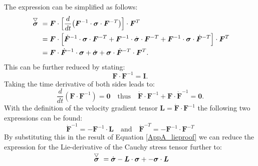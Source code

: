 The expression can be simplified as follows:
\begin{equation}\label{AppA_lieproof}
\begin{split}
\acctriang{\boldsymbol{\sigma}} &= \boldsymbol{F}\cdot\Big[\frac{d}{dt}\big(\boldsymbol{F}^{-1}\cdot\boldsymbol{\sigma}\cdot\boldsymbol{F}^{-T}\big)\Big]\cdot\boldsymbol{F}^T\\
&= \boldsymbol{F}\cdot\Big[\dot{\boldsymbol{F}}^{-1}\cdot\boldsymbol{\sigma}\cdot\boldsymbol{F}^{-T}+\boldsymbol{F}^{-1}\cdot\dot{\boldsymbol{\sigma}}\cdot\boldsymbol{F}^{-T}+\boldsymbol{F}^{-1}\cdot\boldsymbol{\sigma}\cdot\dot{\boldsymbol{F}}^{-T}\Big]\cdot\boldsymbol{F}^T\\
&= \boldsymbol{F}\cdot\dot{\boldsymbol{F}}^{-1}\cdot\boldsymbol{\sigma}+\dot{\boldsymbol{\sigma}}+\boldsymbol{\sigma}\cdot\dot{\boldsymbol{F}}^{-T}\cdot\boldsymbol{F}^T.
\end{split}
\end{equation}
This can be further reduced by stating:
\begin{equation}
\boldsymbol{F}\cdot\boldsymbol{F}^{-1}=\boldsymbol{I}.
\end{equation}
Taking the time derivative of both sides leads to:
\begin{equation}
\frac{d}{dt}(\boldsymbol{F}\cdot\boldsymbol{F}^{-1})=\boldsymbol{0} \quad\text{thus}\quad \dot{\boldsymbol{F}}\cdot\boldsymbol{F}^{-1} + \boldsymbol{F}\cdot\dot{\boldsymbol{F}}^{-1} = \boldsymbol{0}.
\end{equation}
With the definition of the velocity gradient tensor $\boldsymbol{L}=\dot{\boldsymbol{F}}\cdot\boldsymbol{F}^{-1}$ the following two expressions can be found:
\begin{equation}
\dot{\boldsymbol{F}}^{-1} = -\boldsymbol{F}^{-1}\cdot\boldsymbol{L} \quad\text{and}\quad \dot{\boldsymbol{F}}^{-T} = -\boldsymbol{F}^{-1}\cdot\boldsymbol{F}^{-T}
\end{equation}
By substituting this in the result of Equation \ref{AppA_lieproof} we can reduce the expression for the Lie-derivative of the Cauchy stress tensor further to:
\begin{equation}
\acctriang{\boldsymbol{\sigma}}=\dot{\boldsymbol{\sigma}}-\boldsymbol{L}\cdot\boldsymbol{\sigma}+-\boldsymbol{\sigma}\cdot\boldsymbol{L}
\end{equation}


